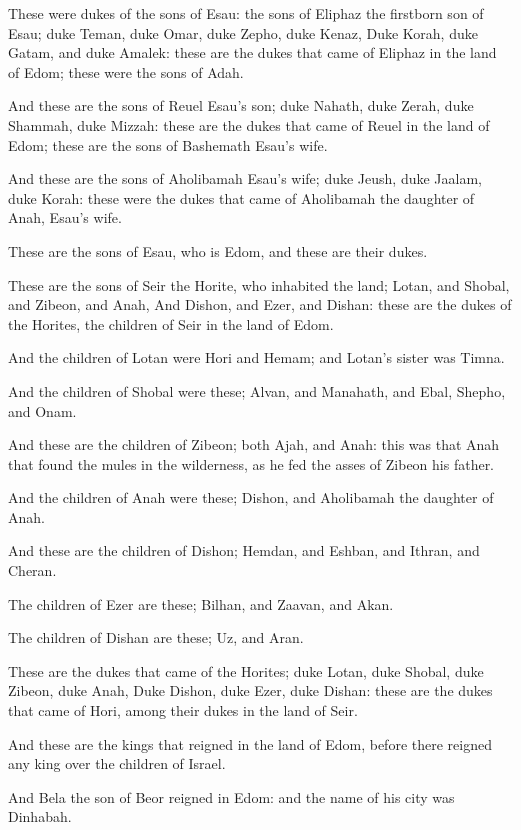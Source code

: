 \verse These were dukes of the sons of Esau: the sons of Eliphaz the
firstborn son of Esau; duke Teman, duke Omar, duke Zepho, duke Kenaz,
\verse Duke Korah, duke Gatam, and duke Amalek: these are the dukes
that came of Eliphaz in the land of Edom; these were the sons of Adah.

\verse And these are the sons of Reuel Esau's son; duke Nahath, duke
Zerah, duke Shammah, duke Mizzah: these are the dukes that came of
Reuel in the land of Edom; these are the sons of Bashemath Esau's
wife.

\verse And these are the sons of Aholibamah Esau's wife; duke Jeush,
duke Jaalam, duke Korah: these were the dukes that came of Aholibamah
the daughter of Anah, Esau's wife.

\verse These are the sons of Esau, who is Edom, and these are their
dukes.

\verse These are the sons of Seir the Horite, who inhabited the land;
Lotan, and Shobal, and Zibeon, and Anah, \verse And Dishon, and Ezer,
and Dishan: these are the dukes of the Horites, the children of Seir
in the land of Edom.

\verse And the children of Lotan were Hori and Hemam; and Lotan's
sister was Timna.

\verse And the children of Shobal were these; Alvan, and Manahath, and
Ebal, Shepho, and Onam.

\verse And these are the children of Zibeon; both Ajah, and Anah: this
was that Anah that found the mules in the wilderness, as he fed the
asses of Zibeon his father.

\verse And the children of Anah were these; Dishon, and Aholibamah the
daughter of Anah.

\verse And these are the children of Dishon; Hemdan, and Eshban, and
Ithran, and Cheran.

\verse The children of Ezer are these; Bilhan, and Zaavan, and Akan.

\verse The children of Dishan are these; Uz, and Aran.

\verse These are the dukes that came of the Horites; duke Lotan, duke
Shobal, duke Zibeon, duke Anah, \verse Duke Dishon, duke Ezer, duke
Dishan: these are the dukes that came of Hori, among their dukes in
the land of Seir.

\verse And these are the kings that reigned in the land of Edom, before
there reigned any king over the children of Israel.

\verse And Bela the son of Beor reigned in Edom: and the name of his
city was Dinhabah.


